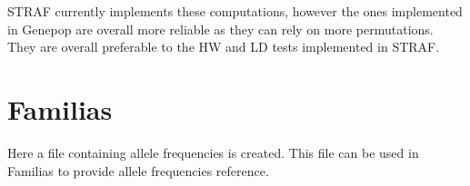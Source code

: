 \documentclass[
]{book}
\begin{document}
STRAF currently implements these computations, however the ones implemented in
Genepop are overall more reliable as they can rely on more permutations. They
are overall preferable to the HW and LD tests implemented in STRAF.

\hypertarget{familias}{%
\section{Familias}\label{familias}}

Here a file containing allele frequencies is created. This file can be used in
Familias to provide allele frequencies reference.
\end{document}
